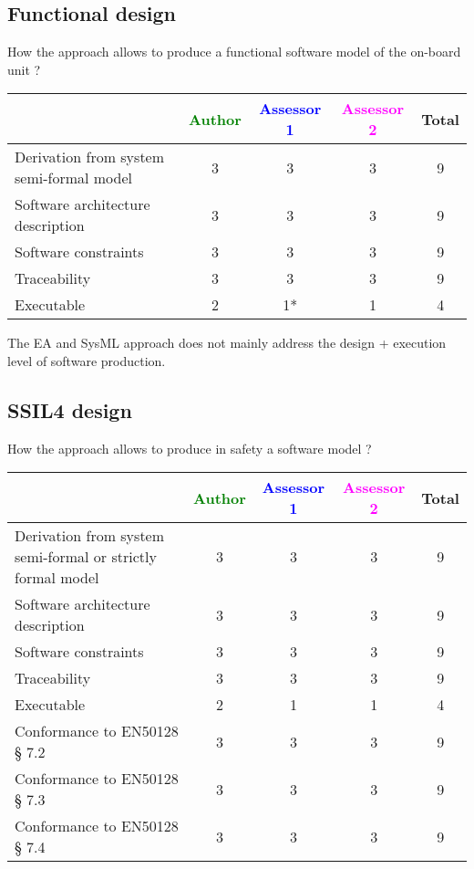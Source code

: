 \subsection{Functional design}

How the approach allows to  produce a functional software model of the on-board unit ?

\begin{tabular}{|l | c | c | c | c|}
\hline
& \textcolor{green}{Author} & \textcolor{blue}{Assessor 1} & \textcolor{magenta}{Assessor 2} & Total \\
\hline
Derivation from system semi-formal model  &3 & 3& 3& 9 \\
\hline 
Software architecture description  &3 & 3& 3& 9 \\
\hline
Software constraints  &3 & 3& 3& 9 \\
\hline
Traceability  &3 & 3&3 & 9 \\
\hline
Executable  &2 & 1*& 1& 4 \\
\hline
\end{tabular}

\begin{assessor1}
The EA and SysML approach does not mainly address the design + execution level of software production. 
\end{assessor1}

\subsection{SSIL4 design}

How the approach allows to produce in safety a software model ?

\begin{tabular}{|l | c | c | c | c|}
\hline
& \textcolor{green}{Author} & \textcolor{blue}{Assessor 1} & \textcolor{magenta}{Assessor 2} & Total \\
\hline
Derivation from system semi-formal or strictly formal model  &3 & 3& 3& 9 \\
\hline 
Software architecture description  &3 & 3& 3& 9 \\
\hline
Software constraints  &3 & 3& 3& 9 \\
\hline
Traceability  &3 & 3& 3& 9 \\
\hline
Executable  &2 & 1& 1& 4 \\
\hline
Conformance to EN50128 § 7.2  &3 & 3& 3& 9 \\
\hline
Conformance to EN50128 § 7.3  &3 & 3& 3& 9 \\
\hline
Conformance to EN50128 § 7.4  & 3& 3& 3& 9 \\
\hline
\end{tabular}

